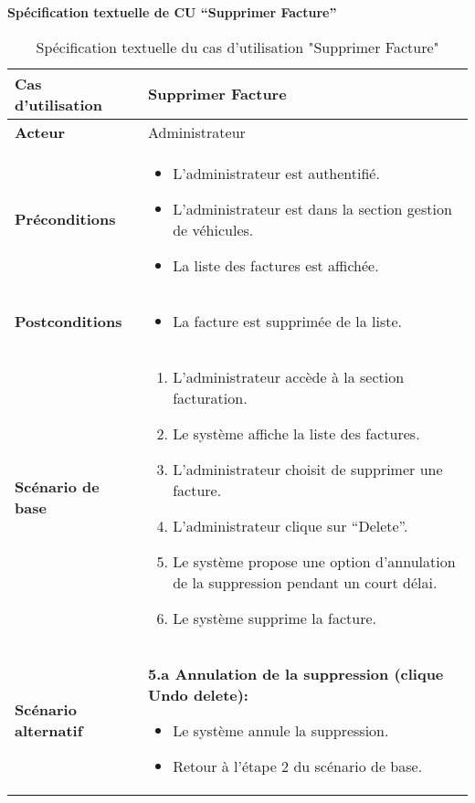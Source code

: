 \documentclass[a4paper,11pt]{report}
\begin{document}
\newpage
\textbf{Spécification textuelle de CU “Supprimer Facture”}
\begin{table}[H]
  \centering
  \renewcommand{\arraystretch}{1.5}
  \caption{Spécification textuelle du cas d'utilisation "Supprimer Facture"}
  \begin{tabularx}{\textwidth}{|l|X|}
    \hline
    \textbf{Cas d'utilisation} & Supprimer Facture \\ \hline
    \textbf{Acteur}            & Administrateur \\ \hline
    \textbf{Préconditions}     & 
      \begin{itemize}
        \item L’administrateur est authentifié.
        \item L'administrateur est dans la section gestion de véhicules.
        \item La liste des factures est affichée.
      \end{itemize} \\ \hline
    \textbf{Postconditions}    & 
      \begin{itemize}
        \item La facture est supprimée de la liste.
      \end{itemize} \\ \hline
    \textbf{Scénario de base}  & 
      \begin{enumerate}
        \item L’administrateur accède à la section facturation.
        \item Le système affiche la liste des factures.
        \item L'administrateur choisit de supprimer une facture.
        \item L'administrateur clique sur “Delete”.
        \item Le système propose une option d’annulation de la suppression pendant un court délai.

        \item Le système supprime la facture.
      \end{enumerate} \\ \hline
    \textbf{Scénario alternatif} & 
      \textbf{5.a Annulation de la suppression (clique Undo delete):}
      \begin{itemize}
        \item Le système annule la suppression.
        \item Retour à l’étape 2 du scénario de base.
      \end{itemize} \\ \hline
  \end{tabularx}
\end{table}
\end{document}
